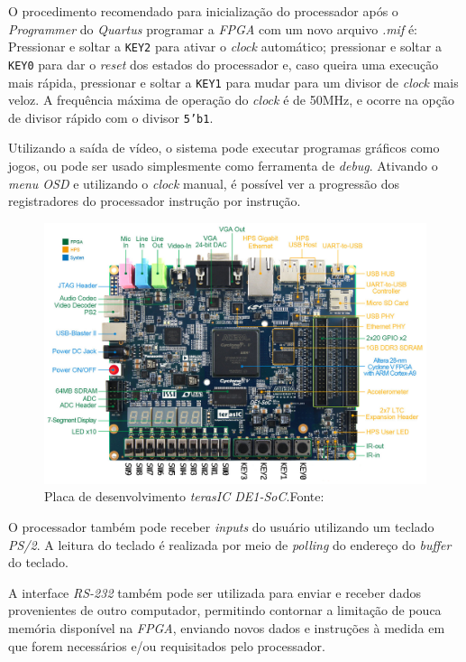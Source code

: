     { O procedimento recomendado para inicialização do processador após o
        \textit{Programmer} do \textit{Quartus} programar a \textit{FPGA} com
        um novo arquivo \textit{.mif} é: Pressionar e soltar a \texttt{KEY2}
        para ativar o \textit{clock} automático; pressionar e soltar a
        \texttt{KEY0} para dar o \textit{reset} dos estados do processador e,
        caso queira uma execução mais rápida, pressionar e soltar a \texttt{KEY1}
        para mudar para um divisor de \textit{clock} mais veloz. A frequência
        máxima de operação do \textit{clock} é de 50MHz, e ocorre na opção de
        divisor rápido com o divisor \texttt{5'b1}.
    }

    { Utilizando a saída de vídeo, o sistema pode executar programas gráficos
        como jogos, ou pode ser usado simplesmente como ferramenta de \textit{debug}.
        Ativando o \textit{menu OSD} e utilizando o \textit{clock} manual, é
        possível ver a progressão dos registradores do processador instrução por
        instrução.
    }
    \begin{figure}[H]
    \centering
        \includegraphics[width=.9\linewidth]{../images/fpga/de1_soc_subs.png}
        \caption[Placa de desenvolvimento \textit{terasIC DE1-SoC}.]{Placa de
        desenvolvimento \textit{terasIC DE1-SoC}.\quad Fonte:~\cite{terasic_de1_soc}}
        \label{fig:de1_soc}
    \end{figure}

    { O processador também pode receber \textit{inputs} do usuário utilizando
        um teclado \textit{PS/2}. A leitura do teclado é realizada por meio de
        \textit{polling} do endereço do \textit{buffer} do teclado.
    }

     { A interface \textit{RS-232} também pode ser utilizada para enviar e receber
         dados provenientes de outro computador, permitindo contornar a limitação
         de pouca memória disponível na \textit{FPGA}, enviando novos dados e
         instruções à medida em que forem necessários e/ou requisitados pelo
         processador.
     }


